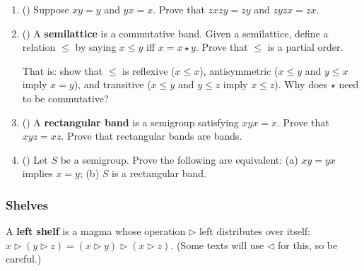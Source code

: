 \documentclass[11pt,paper=letter]{scrartcl}
\newcommand{\sleft}{\triangleright}
\newcommand{\sright}{\triangleleft}
\begin{document}
\begin{enumerate}
\item (\href{https://proofwiki.org/wiki/Properties_of_Idempotent_Semigroup/1}{\!}) Suppose $xy = y$ and $yx = x$. Prove that $zxzy = zy$ and $zyzx = zx$.

\item (\href{https://proofwiki.org/wiki/Semilattice_Induces_Ordering}{\!}) A \textbf{semilattice} is a commutative band. Given a semilattice, define a relation $\le$ by saying $x \le y$ iff $x = x \star y$. Prove that $\le$ is a partial order.

That is: show that $\le$ is reflexive ($x \le x$), antisymmetric ($x \le y$ and $y \le x$ imply $x = y$), and transitive ($x \le y$ and $y \le z$ imply $x \le z$). Why does $\star$ need to be commutative?

\item (\href{https://golem.ph.utexas.edu/category/2015/06/semigroup_puzzles.html}{\!}) A \textbf{rectangular band} is a semigroup satisfying $xyx = x$. Prove that $xyz = xz$. Prove that rectangular bands are bands.
%

\item (\href{https://math.stackexchange.com/q/1428262/680415}{\!}) Let $S$ be a semigroup. Prove the following are equivalent: (a) $xy = yx$ implies $x = y$; (b) $S$ is a rectangular band.
%

\end{enumerate}

\subsubsection*{Shelves}

A \textbf{left shelf} is a magma whose operation $\sleft$ left distributes over itself: $x \sleft (y \sleft z) = (x \sleft y) \sleft (x \sleft z)$. (Some texts will use $\sright$ for this, so be careful.)
\end{document}
